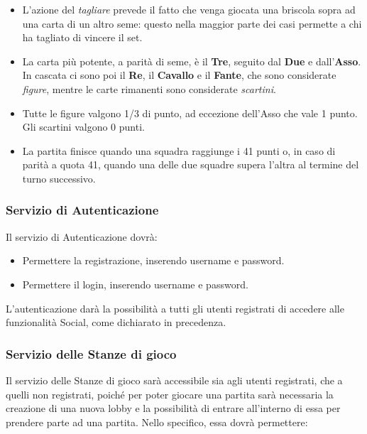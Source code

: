 \begin {itemize}
            \item L'azione del \textit{tagliare} prevede il fatto che venga giocata una briscola sopra ad una carta di un altro seme: questo nella maggior parte dei casi permette a chi ha tagliato di vincere il set. 
            \item La carta più potente, a parità di seme, è il \textbf{Tre}, seguito dal \textbf{Due} e dall'\textbf{Asso}. In cascata ci sono poi il \textbf{Re}, il \textbf{Cavallo} e il \textbf{Fante}, che sono considerate \textit{figure}, mentre le carte rimanenti sono considerate \textit {scartini}.
            \item Tutte le figure valgono 1/3 di punto, ad eccezione dell'Asso che vale 1 punto. Gli scartini valgono 0 punti.
            \item La partita finisce quando una squadra raggiunge i 41 punti o, in caso di parità a quota 41, quando una delle due squadre supera l'altra al termine del turno successivo. 
            \end {itemize}

            \subsubsection[Autenticazione]{\large {Servizio di Autenticazione}\label{subsub:requirements:auth}}
            Il servizio di Autenticazione dovrà:
            
            \begin {itemize}
            \item Permettere la registrazione, inserendo username e password.
            \item Permettere il login, inserendo username e password.
            \end {itemize}
            
            L'autenticazione darà la possibilità a tutti gli utenti registrati di accedere alle funzionalità Social, come dichiarato in precedenza. 
            
            \subsubsection[Stanze di Gioco]{\large {Servizio delle Stanze di gioco}\label{subsub:requirements:lobby}}
            Il servizio delle Stanze di gioco sarà accessibile sia agli utenti registrati, che a quelli non registrati, poiché per poter giocare una partita sarà necessaria la creazione di una nuova lobby e la possibilità di entrare all'interno di essa per prendere parte ad una partita. Nello specifico, essa dovrà permettere:
            
